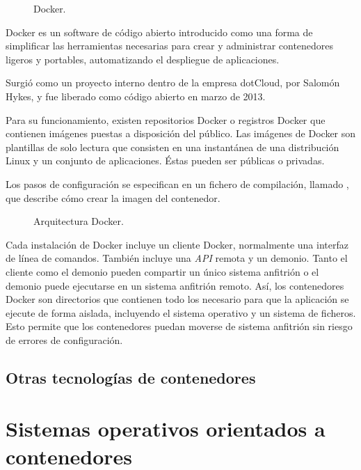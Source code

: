 \begin{figure}[H]
\caption{Docker.\label{fig:figure_placement_example}}
\end{figure}

Docker es un software de código abierto introducido como una forma de simplificar las herramientas necesarias para crear y administrar contenedores ligeros y portables, automatizando el despliegue de aplicaciones.

Surgió como un proyecto interno dentro de la empresa dotCloud, por Salomón Hykes, y fue liberado como código abierto en marzo de 2013.

Para su funcionamiento, existen repositorios Docker o registros Docker que contienen imágenes puestas a disposición del público. Las imágenes de Docker son plantillas de solo lectura que consisten en una instantánea de una distribución Linux y un conjunto de aplicaciones. Éstas pueden ser públicas o privadas.

Los pasos de configuración se especifican en un fichero de compilación, llamado , que describe cómo crear la imagen del contenedor.

\begin{figure}[H]
\caption{Arquitectura Docker.\label{fig:figure_placement_example}}
\end{figure}

Cada instalación de Docker incluye un cliente Docker, normalmente una interfaz de línea de comandos. También incluye una \textit{API} remota y un demonio. Tanto el cliente como el demonio pueden compartir un único sistema anfitrión o el demonio puede ejecutarse en un sistema anfitrión remoto. Así, los contenedores Docker son directorios que contienen todo los necesario para que la aplicación se ejecute de forma aislada, incluyendo el sistema operativo y un sistema de ficheros. Esto permite que los contenedores puedan moverse de sistema anfitrión sin riesgo de errores de configuración.

\subsection{Otras tecnologías de contenedores}

\section{Sistemas operativos orientados a contenedores}

